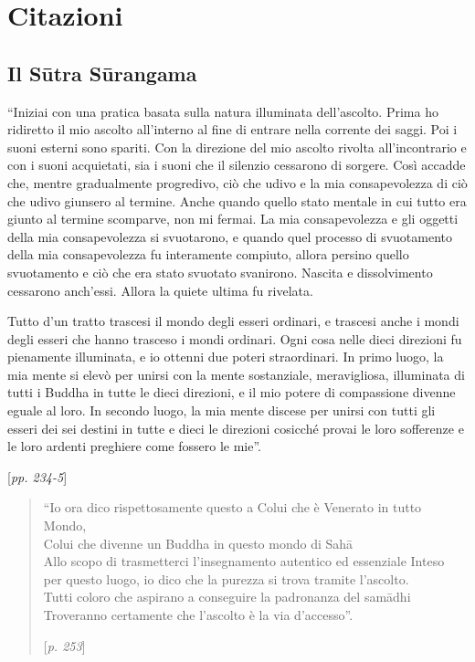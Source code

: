 \chapter{Citazioni}

\setlength{\parindent}{0pt}
\setlength{\parskip}{0.5\baselineskip}

\section*{Il Sūtra Sūrangama}

``Iniziai con una pratica basata sulla natura illuminata dell'ascolto.
Prima ho ridiretto il mio ascolto all'interno al fine di entrare nella
corrente dei saggi. Poi i suoni esterni sono spariti. Con la direzione
del mio ascolto rivolta all'incontrario e con i suoni acquietati, sia i
suoni che il silenzio cessarono di sorgere. Così accadde che, mentre
gradualmente progredivo, ciò che udivo e la mia consapevolezza di ciò
che udivo giunsero al termine. Anche quando quello stato mentale in cui
tutto era giunto al termine scomparve, non mi fermai. La mia
consapevolezza e gli oggetti della mia consapevolezza si svuotarono, e
quando quel processo di svuotamento della mia consapevolezza fu
interamente compiuto, allora persino quello svuotamento e ciò che era
stato svuotato svanirono. Nascita e dissolvimento cessarono anch'essi.
Allora la quiete ultima fu rivelata.

Tutto d'un tratto trascesi il mondo degli esseri ordinari, e trascesi
anche i mondi degli esseri che hanno trasceso i mondi ordinari. Ogni
cosa nelle dieci direzioni fu pienamente illuminata, e io ottenni due
poteri straordinari. In primo luogo, la mia mente si elevò per unirsi
con la mente sostanziale, meravigliosa, illuminata di tutti i Buddha in
tutte le dieci direzioni, e il mio potere di compassione divenne eguale
al loro. In secondo luogo, la mia mente discese per unirsi con tutti gli
esseri dei sei destini in tutte e dieci le direzioni cosicché provai le
loro sofferenze e le loro ardenti preghiere come fossero le mie''.

[\emph{pp. 234-5}]

\clearpage

\begin{quotation}
``Io ora dico rispettosamente questo a Colui che è Venerato in tutto Mondo,\\
Colui che divenne un Buddha in questo mondo di Sahā\\
Allo scopo di trasmetterci l'insegnamento autentico ed essenziale Inteso\\
per questo luogo, io dico che la purezza si trova tramite l'ascolto.\\
Tutti coloro che aspirano a conseguire la padronanza del samādhi\\
Troveranno certamente che l'ascolto è la via d'accesso''.

[\emph{p. 253}]
\end{quotation}

